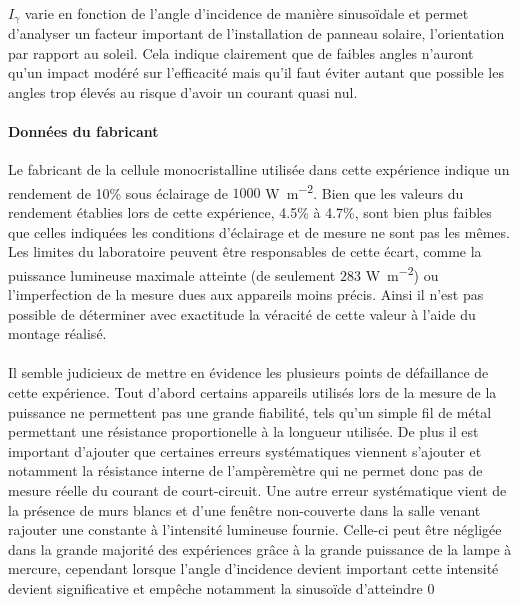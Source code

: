 \paragraph{}
\(I_\gamma\) varie en fonction de l'angle d'incidence de manière sinusoïdale et permet d'analyser un facteur important de l'installation de panneau solaire, l'orientation par rapport au soleil. Cela indique clairement que de faibles angles n'auront qu'un impact modéré sur l'efficacité mais qu'il faut éviter autant que possible les angles trop élevés au risque d'avoir un courant quasi nul.

\paragraph{Données du fabricant}
Le fabricant de la cellule monocristalline utilisée dans cette expérience indique un rendement de 10\% sous éclairage de \(1000\) \unit{\watt \per \square \meter}. Bien que les valeurs du rendement établies lors de cette expérience, 4.5\% à 4.7\%, sont bien plus faibles que celles indiquées les conditions d'éclairage et de mesure ne sont pas les mêmes. Les limites du laboratoire peuvent être responsables de cette écart, comme la puissance lumineuse maximale atteinte (de seulement \(283\) \unit{\watt \per \square \meter}) ou l'imperfection de la mesure dues aux appareils moins précis. Ainsi il n'est pas possible de déterminer avec exactitude la véracité de cette valeur à l'aide du montage réalisé.

\paragraph{}
Il semble judicieux de mettre en évidence les plusieurs points de défaillance de cette expérience. Tout d'abord certains appareils utilisés lors de la mesure de la puissance ne permettent pas une grande fiabilité, tels qu'un simple fil de métal permettant une résistance proportionelle à la longueur utilisée. De plus il est important d'ajouter que certaines erreurs systématiques viennent s'ajouter et notamment la résistance interne de l'ampèremètre qui ne permet donc pas de mesure réelle du courant de court-circuit. Une autre erreur systématique vient de la présence de murs blancs et d'une fenêtre non-couverte dans la salle venant rajouter une constante à l'intensité lumineuse fournie. Celle-ci peut être négligée dans la grande majorité des expériences grâce à la grande puissance de la lampe à mercure, cependant lorsque l'angle d'incidence devient important cette intensité devient significative et empêche notamment la sinusoïde d'atteindre \(0\) \unit{\amper}